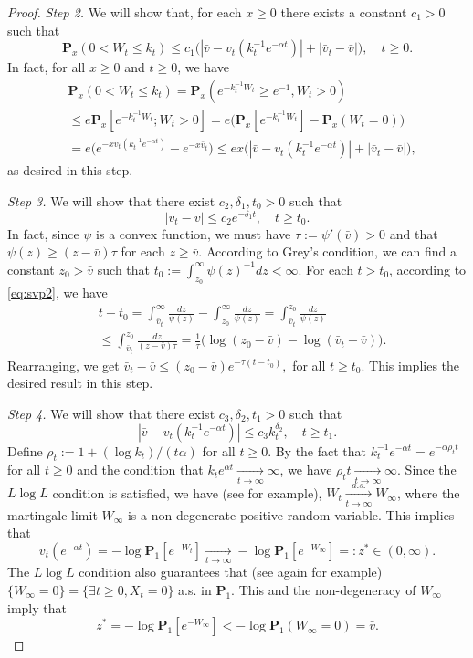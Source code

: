\documentclass[12pt,a4paper]{amsart}
\theoremstyle{plain}
\theoremstyle{definition}
\numberwithin{equation}{section}
\begin{document}
\begin{proof}
  \emph{Step 2.} We will show that, for each $x \geq 0$ there exists a constant $c_1>0$ such that
  \[
    \mathbf P_{x}(0< W_t\leq k_t)
    \leq c_1\big(|\bar v- v_t(k_t^{-1}e^{-\alpha t})|+|\bar v_t - \bar v|\big),
    \quad t\geq 0.
  \]
  In fact, for all $x\geq 0$ and $t\geq 0$, we have
  \begin{align}
    & \mathbf P_{x}(0<W_t \leq k_t)
      = \mathbf P_{x}( e^{-k_t^{-1}W_t}\geq e^{-1},W_t > 0) \\
    & \leq e \mathbf P_{x}[e^{-k_t^{-1} W_t};W_t > 0]
      =  e\big(\mathbf P_x[e^{-k_t^{-1} W_t}]-\mathbf P_x(W_t = 0)\big) \\
    & = e\big(e^{-xv_t(k_t^{-1} e^{-\alpha t})}-e^{-x\bar v_t}\big)
      \leq ex \big(|\bar v-v_t(k_t^{-1} e^{-\alpha t})|+ |\bar v_t- \bar v|\big),
  \end{align}
  as desired in this step.

  \emph{Step 3.} We will show that there exist $c_2, \delta_1, t_0 > 0$ such that
  \[
    |\bar v_t-\bar v|
    \leq c_2e^{-\delta_1 t}
    , \quad t\geq t_0.
  \]
  In fact, since $\psi$ is a convex function, we must have $\tau:=\psi'(\bar v)>0$ and that  $\psi(z) \geq (z-\bar v)\tau$ for each $z\geq \bar v$.
  According to Grey's condition, we can find a constant $z_0 >\bar v $ such that $t_0 := \int^\infty_{z_0}\psi(z)^{-1}dz<\infty$.
  For each $t > t_0$, according to \eqref{eq:svp2}, we have
  \begin{align}
    & t - t_0 =
      \int^\infty_{\bar v_t} \frac{dz}{\psi(z)} - \int_{z_0}^\infty \frac{dz}{\psi(z)}
      = \int_{\bar v_t}^{z_0} \frac{dz}{\psi(z)} \\
    & \leq \int_{\bar v_t}^{z_0} \frac{dz}{(z-\bar v)\tau}
      = \frac{1}{\tau} \big(\log (z_0-\bar v) - \log(\bar v_t-\bar v)\big).
  \end{align}
  Rearranging, we get $ \bar v_t - \bar v \leq (z_0 - \bar v)e^{-\tau(t-t_0)}, $ for all $t\geq t_0$.
  This implies the desired result in this step.

  \emph{Step 4.}
  We will show that there exist $c_3, \delta_2, t_1>0$ such that
  \[
    |\bar v - v_t(k_t^{-1} e^{-\alpha t})|\leq
    c_3k_t^{\delta_2}, \quad t\geq t_1.
  \]
  Define $\rho_t := 1+(\log k_t)/(t\alpha)$ for all $t\geq 0$.
  By the fact that $k_t^{-1}e^{-\alpha t} = e^{-\alpha \rho_t t}$ for  all $t\geq 0$ and the condition that $k_t e^{\alpha t} \xrightarrow[t\to \infty]{} \infty$, we have $\rho_t t \xrightarrow[t\to \infty]{} \infty $.
  Since the $L\log L$ condition is satisfied, we have (see \cite{LiuRenSong2009Llog} for example), $W_t \xrightarrow[t\to \infty]{a.s.} W_\infty$, where the martingale limit $W_\infty$ is a non-degenerate positive random variable. 
  This implies that
  \[
    v_t(e^{-\alpha t})
    = -\log \mathbf P_1[e^{-W_t}]\xrightarrow[t\to \infty]{} - \log \mathbf P_{1}[e^{-W_\infty}]
    =: z^* \in (0,\infty).
  \]
  The $L \log L$ condition also guarantees that (see again \cite{LiuRenSong2009Llog} for example) $\{W_\infty = 0\} = \{\exists t \geq 0, X_t= 0\}$  a.s. in $\mathbf P_1$. This and the non-degeneracy of $W_\infty$ imply that
  \[
    z^*
    = -\log \mathbf P_1[e^{-W_\infty}]
    < -\log \mathbf P_1(W_\infty = 0) = \bar v.
  \]


\end{proof}
\end{document}
